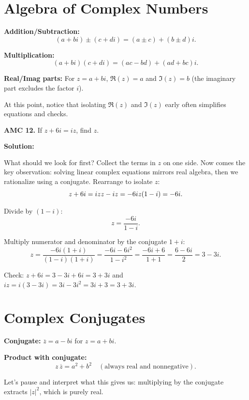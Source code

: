 \documentclass[12pt]{extarticle}
\begin{document}

\section{Algebra of Complex Numbers}

\textbf{Addition/Subtraction:}
\[
 (a+bi) \pm (c+di) = (a\pm c) + (b\pm d)i.
\]

\textbf{Multiplication:}
\[
 (a+bi)(c+di) = (ac-bd) + (ad+bc)i.
\]

\textbf{Real/Imag parts:} For $z=a+bi$, $\Re(z)=a$ and $\Im(z)=b$ (the imaginary part excludes the factor $i$).

At this point, notice that isolating $\Re(z)$ and $\Im(z)$ early often simplifies equations and checks.

\begin{examplebox}
\textbf{AMC 12.} If $z+6i=iz$, find $z$.
\end{examplebox}

\textbf{Solution:}

What should we look for first? Collect the terms in $z$ on one side.
Now comes the key observation: solving linear complex equations mirrors real algebra, then we rationalize using a conjugate.
Rearrange to isolate $z$:
\[
z + 6i = iz \\
z - iz = -6i \\
z(1 - i) = -6i.
\]

Divide by $(1 - i)$:
\[
z = \frac{-6i}{1-i}.
\]

Multiply numerator and denominator by the conjugate $1 + i$:
\[
z = \frac{-6i(1+i)}{(1-i)(1+i)} = \frac{-6i - 6i^2}{1 - i^2} = \frac{-6i + 6}{1 + 1} = \frac{6 - 6i}{2} = 3 - 3i.
\]

Check: $z + 6i = 3 - 3i + 6i = 3 + 3i$ and $iz = i(3 - 3i) = 3i - 3i^2 = 3i + 3 = 3 + 3i$. \checkmark


\section{Complex Conjugates}

\textbf{Conjugate:} $\overline{z}=a-bi$ for $z=a+bi$.

\textbf{Product with conjugate:}
\[
 z\,\overline{z} = a^2 + b^2 \quad (\text{always real and nonnegative}).
\]

Let’s pause and interpret what this gives us: multiplying by the conjugate extracts $|z|^2$, which is purely real.
\end{document}
